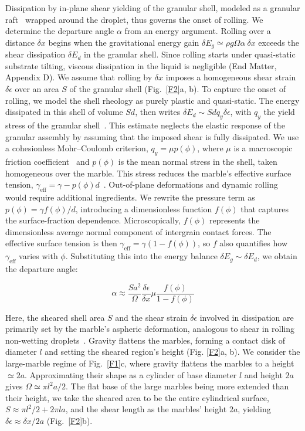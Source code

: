 \documentclass[twocolumn, prl,
 amsmath,amssymb,
 superscriptaddress,aps,
]{revtex4-2}
\begin{document}
Dissipation by in-plane shear yielding of the granular shell, modeled as a granular raft~\cite{cicuta2009granular,protiere2023particle} wrapped around the droplet, thus governs the onset of rolling.
We determine the departure angle $\alpha$ from an energy argument. 
Rolling over a distance $\delta x$ begins when the gravitational energy gain $\delta E_g\simeq\rho g\Omega\alpha \ \delta x$ exceeds the shear dissipation $\delta E_d$ in the granular shell. 
Since rolling starts under quasi-static substrate tilting, viscous dissipation in the liquid is negligible (End Matter, Appendix D).
We assume that rolling by $\delta x$ imposes a homogeneous shear strain $\delta \epsilon$ over an area $S$ of the granular shell (Fig.~\ref{F2}a, b). To capture the onset of rolling, we model the shell rheology as purely plastic and quasi-static. The energy dissipated in this shell of volume $Sd$, then writes $\delta E_d\sim S d q_y \delta\epsilon$, with $q_y$ the yield stress of the granular shell~\cite{kruyt2006shear}.
This estimate neglects the elastic response of the granular assembly by assuming that the imposed shear is fully dissipated. We use a cohesionless Mohr--Coulomb criterion, $q_y=\mu p(\phi)$, where $\mu$ is a macroscopic friction coefficient~\cite{andreotti2013granular} and $p(\phi)$ is the mean normal stress in the shell, taken homogeneous over the marble.
This stress reduces the marble's effective surface tension, $\gamma_{\mathrm{eff}} = \gamma-p(\phi)d$~\cite{cicuta2009granular,lagubeau2014armoring}.
Out-of-plane deformations and dynamic rolling would require additional ingredients.
We rewrite the pressure term as $p(\phi)= \gamma f(\phi)/d$, introducing a dimensionless function $f(\phi)$ that captures the surface-fraction dependence. 
Microscopically, $f(\phi)$ represents the dimensionless average normal component of intergrain contact forces.
The effective surface tension is then  $\gamma_{\mathrm{eff}} = \gamma(1-f(\phi))$, so $f$ also quantifies how $\gamma_\mathrm{eff}$ varies with $\phi$.
 Substituting this into the energy balance $\delta E_g\sim \delta E_d$, we obtain the departure angle:

\begin{equation}
     \alpha \approx \frac{S a^2}{\Omega}\frac{\delta\epsilon}{\delta x}\mu \frac{f(\phi)}{1-f(\phi)}
    \label{eq:model_general}
\end{equation}

Here, the sheared shell area $S$ and the shear strain $\delta \epsilon$ involved in dissipation are primarily set by the marble's aspheric deformation, analogous to shear in rolling non-wetting droplets~\cite{mahadevan1999rolling}.
Gravity flattens the marbles, forming a contact disk of diameter $l$ and setting the sheared region's height (Fig. \ref{F2}a, b).
We consider the large-marble regime of Fig.~\ref{F1}c, where gravity flattens the marbles to a height $\simeq2a$. 
Approximating their shape as a cylinder of base diameter $l$ and height $2a$ gives $\Omega\simeq\pi l^2a/2$.
The flat base of the large marbles being more extended than their height, we take the sheared area to be the entire cylindrical surface, $S\approx \pi l^2/2+2\pi l a$, and the shear length as the marbles' height $2a$, yielding $\delta\epsilon\approx\delta x/2a$ (Fig.~\ref{F2}b).
\end{document}
